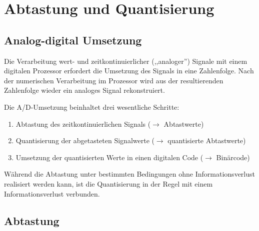 
\chapter{Abtastung und Quantisierung}
\label{chap:abtastung-quantisierung}

\section{Analog-digital Umsetzung}
\label{sec:analog-digital}

Die Verarbeitung wert- und zeitkontinuierlicher (,,analoger'') Signale mit einem digitalen Prozessor erfordert die Umsetzung des Signals in eine Zahlenfolge. Nach der numerischen Verarbeitung im Prozessor wird aus der resultierenden Zahlenfolge wieder ein analoges Signal rekonstruiert.

\begin{center}
\end{center}

Die A/D-Umsetzung beinhaltet drei wesentliche Schritte:
\begin{enumerate}[label=\alph*.]
  \item Abtastung des zeitkontinuierlichen Signals ($\to$ Abtastwerte)
  \item Quantisierung der abgetasteten Signalwerte ($\to$ quantisierte Abtastwerte)
  \item Umsetzung der quantisierten Werte in einen digitalen Code ($\to$ Binärcode)
\end{enumerate}

Während die Abtastung unter bestimmten Bedingungen ohne Informationsverlust realisiert werden kann, ist die Quantisierung in der Regel mit einem Informationsverlust verbunden.

\section{Abtastung}
\label{sec:abtastung}

